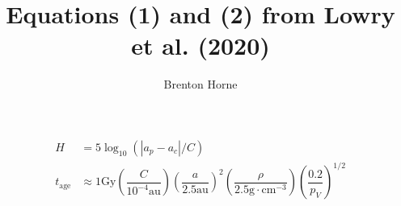 \documentclass[12pt,a4paper,openright]{article}
\title{Equations (1) and (2) from Lowry et al. (2020)}
\author{Brenton Horne}
\begin{document}
\begin{align}
    H &= 5\log_{10}{(|a_p-a_c|/C)} \\
    t_{\mathrm{age}} &\approx 1\mathrm{Gy}\left(\dfrac{C}{10^{-4}\mathrm{au}}\right) \left(\dfrac{a}{2.5\mathrm{au}}\right)^2 \left(\dfrac{\rho}{2.5 \mathrm{g}\cdot \mathrm{cm}^{-3}}\right)\left(\dfrac{0.2}{p_V}\right)^{1/2}
\end{align}
\end{document}
